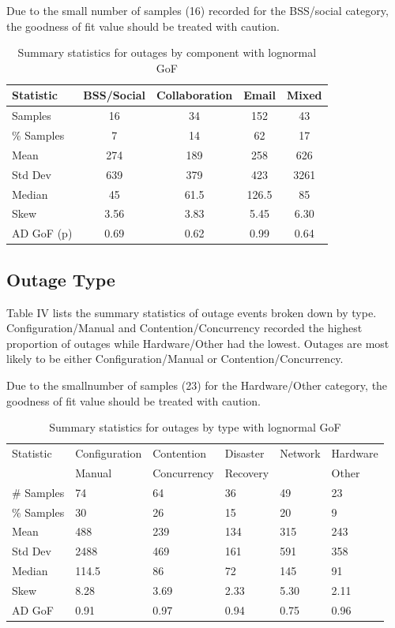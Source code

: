 Due to the small number of samples (16) recorded for the BSS/social category, the goodness of fit value should be treated with caution. \par


\begin {table}
\caption {Summary statistics for outages by component with lognormal GoF} 
\begin{center}
\begin{tabular}{l | c | c | c | c} Statistic & BSS/Social & Collaboration & Email & Mixed
\\ \hline Samples & 16 & 34 & 152 & 43
\\ \% Samples & 7 & 14 & 62 & 17
\\ Mean & 274 & 189 & 258 & 626
\\ Std Dev & 639 & 379 & 423 & 3261
\\ Median & 45	& 61.5 & 126.5 & 85
\\ Skew & 3.56	& 3.83 & 5.45 & 6.30
\\AD GoF (p) & 0.69 & 0.62 & 0.99 & 0.64
\end{tabular}
\end{center}
\end{table}


\subsection{Outage Type}

Table IV lists the summary statistics of outage events broken down by type. Configuration/Manual and Contention/Concurrency recorded the highest proportion of outages while Hardware/Other had the lowest. Outages are most likely to be either Configuration/Manual or Contention/Concurrency. 

Due to the smallnumber of samples (23) for the Hardware/Other category, the goodness of fit value should be treated with caution. \par


\begin {table}
\caption {Summary statistics for outages by type with lognormal GoF} 
\begin{center}
\begin{tabular}{p{1.26cm} |  p{1.3cm} | p{1.3cm} | p{0.9cm} | p{0.9cm} | p{1cm}} Statistic & Configuration & Contention & Disaster & Network & Hardware
\\ & Manual & Concurrency &  Recovery & & Other
\\ \hline \# Samples & 74 & 64 & 36 & 49 & 23
\\ \% Samples & 30 & 26 & 15 & 20 & 9
\\ Mean & 488 & 239 & 134 & 	315	& 243
\\ Std Dev & 2488	& 469 & 161	& 591 	& 358
\\ Median & 114.5	& 86	& 72	& 145	& 91
\\ Skew & 8.28	& 3.69	& 2.33	& 5.30	& 2.11
\\AD GoF  & 0.91 & 0.97 & 0.94 & 0.75 & 0.96
\end{tabular}
\end{center}
\end{table}


